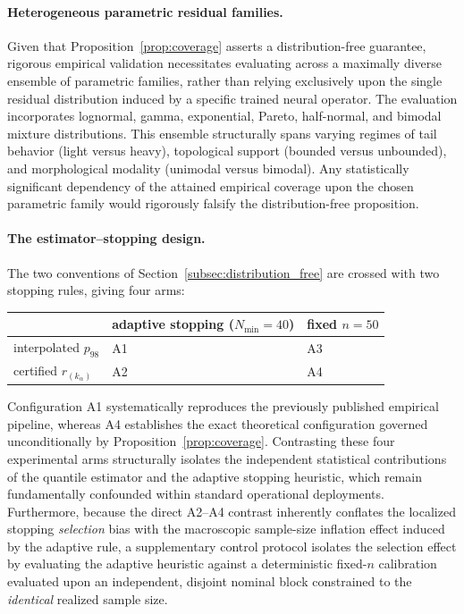 \documentclass[a4paper]{cas-sc}
\newcommand{\residual}{\ensuremath{r}}
\begin{document}
\paragraph{Heterogeneous parametric residual families.}
Given that Proposition~\ref{prop:coverage} asserts a distribution-free guarantee, rigorous empirical validation necessitates evaluating across a maximally diverse ensemble of parametric families, rather than relying exclusively upon the single residual distribution induced by a specific trained neural operator. The evaluation incorporates lognormal, gamma, exponential, Pareto, half-normal, and bimodal mixture distributions. This ensemble structurally spans varying regimes of tail behavior (light versus heavy), topological support (bounded versus unbounded), and morphological modality (unimodal versus bimodal). Any statistically significant dependency of the attained empirical coverage upon the chosen parametric family would rigorously falsify the distribution-free proposition.

\paragraph{The estimator--stopping design.}
The two conventions of
Section~\ref{subsec:distribution_free} are crossed with two stopping rules,
giving four arms:

\begin{center}
\begin{tabular}{lll}
\toprule
 & adaptive stopping (\(N_{\min}=40\)) & fixed \(n=50\) \\
\midrule
interpolated \(p_{98}\)                 & A1 & A3 \\
certified \(\residual_{(k_\alpha)}\)    & A2 & A4 \\
\bottomrule
\end{tabular}
\end{center}

\noindent
Configuration A1 systematically reproduces the previously published empirical pipeline, whereas A4 establishes the exact theoretical configuration governed unconditionally by Proposition~\ref{prop:coverage}. Contrasting these four experimental arms structurally isolates the independent statistical contributions of the quantile estimator and the adaptive stopping heuristic, which remain fundamentally confounded within standard operational deployments. Furthermore, because the direct A2--A4 contrast inherently conflates the localized stopping \emph{selection} bias with the macroscopic sample-size inflation effect induced by the adaptive rule, a supplementary control protocol isolates the selection effect by evaluating the adaptive heuristic against a deterministic fixed-\(n\) calibration evaluated upon an independent, disjoint nominal block constrained to the \emph{identical} realized sample size.
\end{document}
